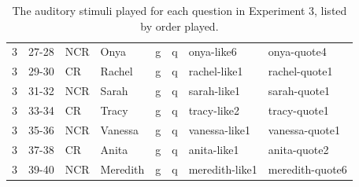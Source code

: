 \begin{table}[htbp]
\begin{center}
{\begin{tabular}{llllllll}
 3 & 27-28 & NCR & Onya & g & q & onya-like6 & onya-quote4 \\
 3 & 29-30 & CR & Rachel & g & q & rachel-like1 & rachel-quote1 \\
 3 & 31-32 & NCR & Sarah & g & q & sarah-like1 & sarah-quote1 \\
 3 & 33-34 & CR & Tracy & g & q & tracy-like2 & tracy-quote1 \\
 3 & 35-36 & NCR & Vanessa & g & q & vanessa-like1 & vanessa-quote1 \\
 3 & 37-38 & CR & Anita & g & q & anita-like1 & anita-quote2 \\
 3 & 39-40 & NCR & Meredith & g & q & meredith-like1 & meredith-quote6 \\
 
    \hline
   
	\end{tabular}
}
	\caption{The auditory stimuli played for each question in Experiment 3, listed by order played.}\label{tab:appenExp3stimuli}
	\end{center}
\end{table}